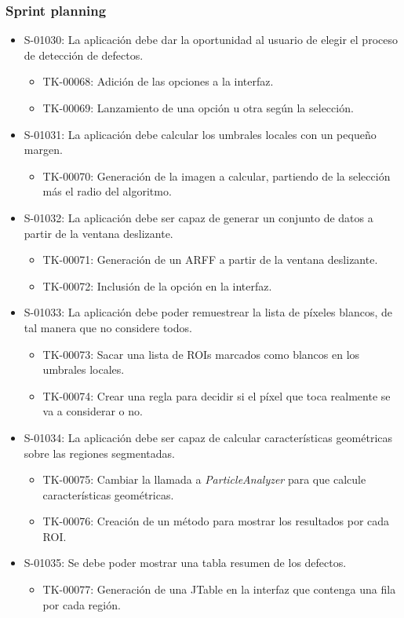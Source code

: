 \subsubsection*{Sprint planning}
\begin{itemize}
 \item S-01030: La aplicación debe dar la oportunidad al usuario de elegir el proceso de detección de defectos.
  \begin{itemize}
   \item TK-00068: Adición de las opciones a la interfaz.
   \item TK-00069: Lanzamiento de una opción u otra según la selección.
  \end{itemize}
 \item S-01031: La aplicación debe calcular los umbrales locales con un pequeño margen.
  \begin{itemize}
   \item TK-00070: Generación de la imagen a calcular, partiendo de la selección más el radio del algoritmo.
  \end{itemize}
 \item S-01032: La aplicación debe ser capaz de generar un conjunto de datos a partir de la ventana deslizante.
 \begin{itemize}
   \item TK-00071: Generación de un ARFF a partir de la ventana deslizante.
   \item TK-00072: Inclusión de la opción en la interfaz.
  \end{itemize}  
 \item S-01033: La aplicación debe poder remuestrear la lista de píxeles blancos, de tal manera que no considere todos.
 \begin{itemize}
   \item TK-00073: Sacar una lista de ROIs marcados como blancos en los umbrales locales.
   \item TK-00074: Crear una regla para decidir si el píxel que toca realmente se va a considerar o no.
  \end{itemize}
 \item S-01034: La aplicación debe ser capaz de calcular características geométricas sobre las regiones segmentadas.
 \begin{itemize}
  \item TK-00075: Cambiar la llamada a \emph{ParticleAnalyzer} para que calcule características geométricas.
  \item TK-00076: Creación de un método para mostrar los resultados por cada ROI.
 \end{itemize}
 \item S-01035: Se debe poder mostrar una tabla resumen de los defectos.
  \begin{itemize}
   \item TK-00077: Generación de una JTable en la interfaz que contenga una fila por cada región.
  \end{itemize}
\end{itemize}

